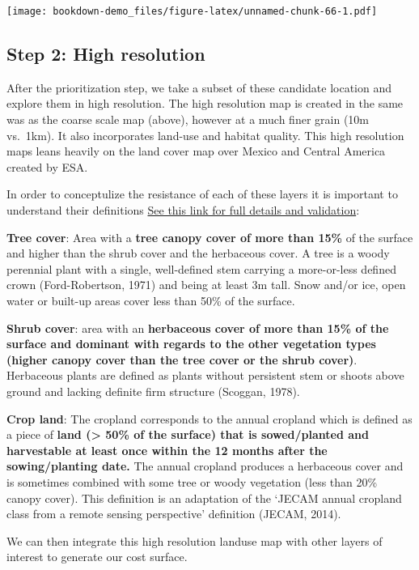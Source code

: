 \documentclass[
]{book}
\begin{document}
\texttt{[image: bookdown-demo\_files/figure-latex/unnamed-chunk-66-1.pdf]}

\hypertarget{step-2-high-resolution}{%
\subsection{Step 2: High resolution}\label{step-2-high-resolution}}

After the prioritization step, we take a subset of these candidate location and explore them in high resolution. The high resolution map is created in the same was as the coarse scale map (above), however at a much finer grain (10m vs.~1km). It also incorporates land-use and habitat quality. This high resolution maps leans heavily on the land cover map over Mexico and Central America created by ESA.

In order to conceptulize the resistance of each of these layers it is important to understand their definitions \href{https://2018mexicolandcover10m.esa.int/documents/ESACCI_CCN2_PVIRv0.3.pdf}{See this link for full details and validation}:

\textbf{Tree cover}: Area with a \textbf{tree canopy cover of more than 15\%} of the surface and higher
than the shrub cover and the herbaceous cover. A tree is a woody perennial
plant with a single, well-defined stem carrying a more-or-less defined crown (Ford-Robertson, 1971) and being at least 3m tall. Snow and/or ice, open water or built-up areas cover less than 50\% of the surface.

\textbf{Shrub cover}: area with an \textbf{herbaceous cover of more than 15\% of the surface and dominant with regards to the other vegetation types (higher canopy cover than the tree cover or the shrub cover)}. Herbaceous plants are defined as plants without persistent stem or shoots above ground and lacking definite firm structure (Scoggan, 1978).

\textbf{Crop land}: The cropland corresponds to the annual cropland which is defined as a piece of \textbf{land (\textgreater{} 50\% of the surface) that is sowed/planted and harvestable at least once within the 12 months after the sowing/planting date.} The annual cropland produces a herbaceous cover and is sometimes combined with some tree or woody vegetation (less than 20\% canopy cover). This definition is an adaptation of the `JECAM annual cropland class from a remote sensing perspective'
definition (JECAM, 2014).

We can then integrate this high resolution landuse map with other layers of interest to generate our cost surface.
\end{document}
